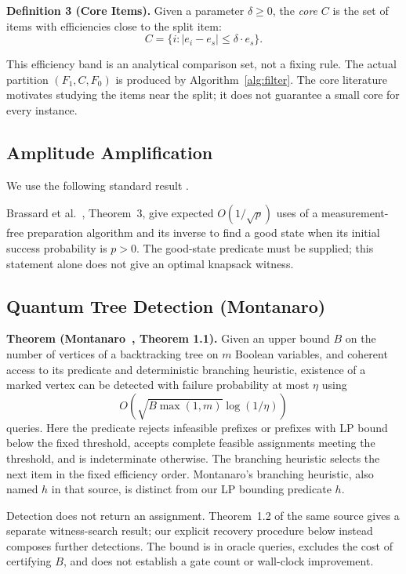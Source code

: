 \documentclass[pdflatex,sn-mathphys-num]{sn-jnl}
\begin{document}
\textbf{Definition 3 (Core Items).} Given a parameter $\delta \ge 0$, the \textit{core} $C$ is the set of items with efficiencies close to the split item:
\begin{equation}
    C = \{i : |e_i - e_s| \leq \delta \cdot e_s\}.
    \label{eq:core}
\end{equation}

This efficiency band is an analytical comparison set, not a fixing rule. The actual partition $(F_1,C,F_0)$ is produced by Algorithm~\ref{alg:filter}. The core literature~\cite{ref4} motivates studying the items near the split; it does not guarantee a small core for every instance.

\subsection{Amplitude Amplification}

We use the following standard result \cite{ref11}.


Brassard et al.~\cite{ref11}, Theorem~3, give expected $O(1/\sqrt{p})$ uses of a measurement-free preparation algorithm and its inverse to find a good state when its initial success probability is $p>0$. The good-state predicate must be supplied; this statement alone does not give an optimal knapsack witness.

\subsection{Quantum Tree Detection (Montanaro)}

\textbf{Theorem (Montanaro~\cite{ref35}, Theorem 1.1).} Given an upper bound $B$ on the number of vertices of a backtracking tree on $m$ Boolean variables, and coherent access to its predicate and deterministic branching heuristic, existence of a marked vertex can be detected with failure probability at most $\eta$ using
\begin{equation}
O\!\left(\sqrt{B\max(1,m)}\log(1/\eta)\right)
\label{eq:montanaro}
\end{equation}
queries. Here the predicate rejects infeasible prefixes or prefixes with LP bound below the fixed threshold, accepts complete feasible assignments meeting the threshold, and is indeterminate otherwise. The branching heuristic selects the next item in the fixed efficiency order. Montanaro's branching heuristic, also named $h$ in that source, is distinct from our LP bounding predicate $h$.

Detection does not return an assignment. Theorem~1.2 of the same source gives a separate witness-search result; our explicit recovery procedure below instead composes further detections. The bound is in oracle queries, excludes the cost of certifying $B$, and does not establish a gate count or wall-clock improvement.
\end{document}
